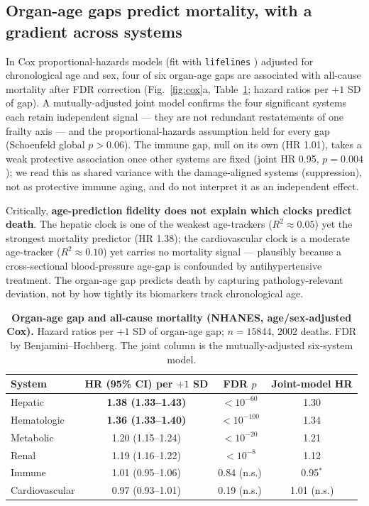 \documentclass[11pt]{article}
\begin{document}
\subsection{Organ-age gaps predict mortality, with a gradient across systems}

In Cox proportional-hazards models (fit with \texttt{lifelines} \citep{davidson2019lifelines})
adjusted for chronological age and sex, four of six organ-age gaps are associated
with all-cause mortality after FDR correction (Fig.~\ref{fig:cox}a, Table~\ref{tab:cox};
hazard ratios per $+1$ SD of gap). A mutually-adjusted joint model confirms the four
significant systems each retain independent signal --- they are not redundant restatements of
one frailty axis --- and the proportional-hazards assumption held for every gap (Schoenfeld
global $p>0.06$). The immune gap, null on its own (HR 1.01), takes a weak protective association
once other systems are fixed (joint HR 0.95, $p=0.004$); we read this as shared variance with
the damage-aligned systems (suppression), not as protective immune aging, and do not interpret
it as an independent effect.

Critically, \textbf{age-prediction fidelity does not explain which clocks predict death}. The
hepatic clock is one of the weakest age-trackers ($R^2\approx0.05$) yet the strongest mortality
predictor (HR 1.38); the cardiovascular clock is a moderate age-tracker ($R^2\approx0.10$) yet
carries no mortality signal --- plausibly because a cross-sectional blood-pressure age-gap is
confounded by antihypertensive treatment. The organ-age gap predicts death by capturing
pathology-relevant deviation, not by how tightly its biomarkers track chronological age.

\begin{table}[t]
\centering
\caption{\textbf{Organ-age gap and all-cause mortality (NHANES, age/sex-adjusted Cox).} Hazard
ratios per $+1$ SD of organ-age gap; $n=\num{15844}$, \num{2002} deaths. FDR by
Benjamini--Hochberg. The joint column is the mutually-adjusted six-system model.}
\label{tab:cox}
\begin{tabular}{lccc}
\toprule
System & HR (95\% CI) per $+1$ SD & FDR $p$ & Joint-model HR \\
\midrule
Hepatic        & \textbf{1.38 (1.33--1.43)} & $<10^{-60}$  & 1.30 \\
Hematologic    & \textbf{1.36 (1.33--1.40)} & $<10^{-100}$ & 1.34 \\
Metabolic      & 1.20 (1.15--1.24)          & $<10^{-20}$  & 1.21 \\
Renal          & 1.19 (1.16--1.22)          & $<10^{-8}$   & 1.12 \\
Immune         & 1.01 (0.95--1.06)          & 0.84 (n.s.)  & 0.95$^{*}$ \\
Cardiovascular & 0.97 (0.93--1.01)          & 0.19 (n.s.)  & 1.01 (n.s.) \\
\bottomrule
\end{tabular}
\end{table}
\end{document}
